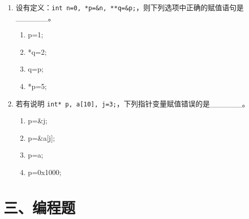 \documentclass[a4paper,12pt]{article}
\begin{document}
\begin{enumerate}
	\item 设有定义：\texttt{int n=0, *p=\&n, **q=\&p;}，则下列选项中正确的赋值语句是\_\_\_\_\_\_。
	      \begin{enumerate}
		      \item[A)] p=1;
		      \item[B)] *q=2;
		      \item[C)] q=p;
		      \item[D)] *p=5;
	      \end{enumerate}
	      \vspace{0.3cm}

	\item 若有说明 \texttt{int* p, a[10], j=3;}，下列指针变量赋值错误的是\_\_\_\_\_\_。
	      \begin{enumerate}
		      \item[A)] p=\&j;
		      \item[B)] p=\&a[j];
		      \item[C)] p=a;
		      \item[D)] p=0x1000;
	      \end{enumerate}
	      \vspace{0.3cm}
\end{enumerate}

\section*{三、编程题}
\end{document}
